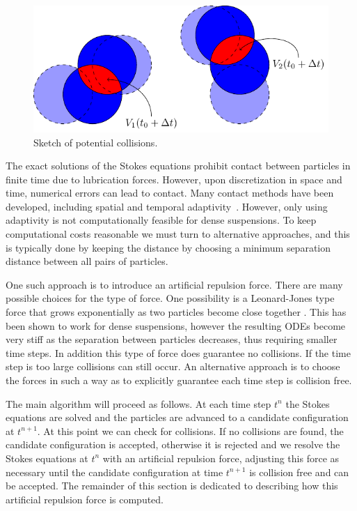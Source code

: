 \documentclass[preprint, 10pt]{elsarticle}
\begin{document}
\begin{figure}[!h]\label{fig:collision_sketch}
\begin{center}
\includegraphics{figures/collisions.pdf}
\end{center}
\caption{Sketch of potential collisions.}
\end{figure}
The exact solutions of the Stokes equations
prohibit contact between particles in finite time due to lubrication
forces.   However, upon discretization in space and time, numerical
errors can lead to contact.  Many contact methods have been developed,
including spatial and temporal adaptivity~\cite{kro1999}.  However, only
using adaptivity is not computationally feasible for dense suspensions.
To keep computational costs reasonable we must turn to alternative
approaches, and this is typically done by keeping the distance by
choosing a minimum separation distance between all pairs of particles. 

One such approach is to introduce an artificial repulsion force. There
are many possible choices for the type of force. One possibility is a
Leonard-Jones type force that grows exponentially as two particles
become close together . This has been shown
to work for dense suspensions, however the resulting ODEs become very
stiff as the separation between particles decreases, thus requiring
smaller time steps. In addition this type of force does guarantee no
collisions. If the time step is too large collisions can still occur. An
alternative approach is to choose the forces in such a way as to
explicitly guarantee each time step is collision free. 

The main algorithm will proceed as follows. At each time step $t^n$ the
Stokes equations are solved and the particles are advanced to a
candidate configuration at $t^{n+1}$. At this point we can check for
collisions. If no collisions are found, the candidate configuration is
accepted, otherwise it is rejected and we resolve the Stokes equations
at $t^n$ with an artificial repulsion force, adjusting this force as
necessary until the candidate configuration at time $t^{n+1}$ is
collision free and can be accepted. The remainder of this section is
dedicated to describing how this artificial repulsion force is computed. 
\end{document}

